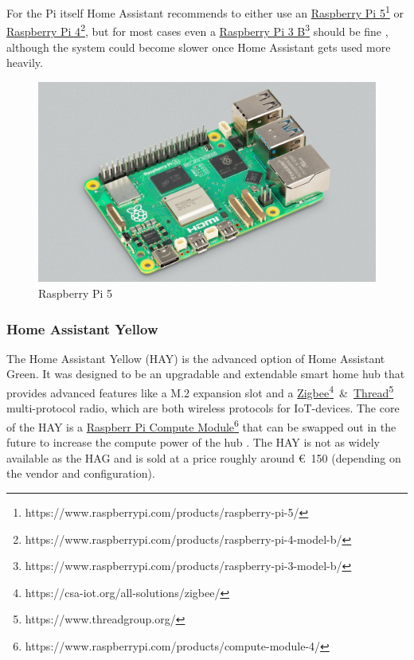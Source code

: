 For the Pi itself Home Assistant recommends to either use an \href{https://www.raspberrypi.com/products/raspberry-pi-5/}{Raspberry Pi 5}\footnote{https://www.raspberrypi.com/products/raspberry-pi-5/} or \href{https://www.raspberrypi.com/products/raspberry-pi-4-model-b/}{Raspberry Pi 4}\footnote{https://www.raspberrypi.com/products/raspberry-pi-4-model-b/}, but for most cases even a \href{https://www.raspberrypi.com/products/raspberry-pi-3-model-b/}{Raspberry Pi 3 B}\footnote{https://www.raspberrypi.com/products/raspberry-pi-3-model-b/} should be fine \cite{HomeAssistant_Installation_Pi}, although the system could become slower once Home Assistant gets used more heavily.

\begin{figure}[H]
    \centering
    \includegraphics[width=.95\linewidth]{img/raspb-pi-5.jpg}
    \caption{Raspberry Pi 5 \cite{RaspberryPi_Doc_Pis}}
    \label{fig:HA-PI}
\end{figure}

\newpage

\subsubsection{Home Assistant Yellow}
The Home Assistant Yellow (HAY) is the advanced option of Home Assistant Green. It was designed to be an upgradable and extendable smart home hub that provides advanced features like a M.2 expansion slot and a \href{https://csa-iot.org/all-solutions/zigbee/}{Zigbee}\footnote{https://csa-iot.org/all-solutions/zigbee/}~\&~\href{https://www.threadgroup.org/}{Thread}\footnote{https://www.threadgroup.org/} multi-protocol radio, which are both wireless protocols for IoT-devices. The core of the HAY is a \href{https://www.raspberrypi.com/products/compute-module-4/}{Raspberr Pi Compute Module}\footnote{https://www.raspberrypi.com/products/compute-module-4/} that can be swapped out in the future to increase the compute power of the hub \cite{HomeAssistant_HAY}. The HAY is not as widely available as the HAG and is sold at a price roughly around €~150 \cite{mauser_HAY} (depending on the vendor and configuration).

